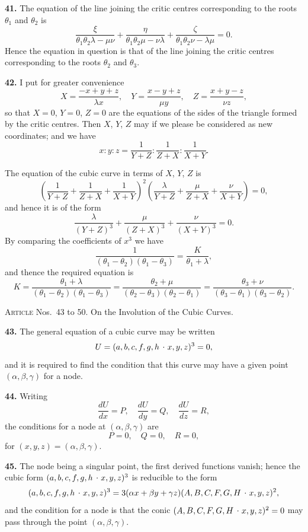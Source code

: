 \documentclass[11pt,a4paper]{article}
\theoremstyle{plain}
\theoremstyle{definition}
\newcommand{\lc}{\kern.17em\raise.5ex\hbox{.}\kern.08em}  %
\begin{document}
\textbf{41.} The equation of the line joining the critic centres corresponding to the roots $\theta_1$ and $\theta_2$ is
\[
\frac{\xi}{\theta_1\theta_2\lambda - \mu\nu} + \frac{\eta}{\theta_1\theta_2\mu - \nu\lambda} + \frac{\zeta}{\theta_1\theta_2\nu - \lambda\mu} = 0.
\]
Hence the equation in question is that of the line joining the critic centres corresponding to the roots $\theta_2$ and $\theta_3$.

\textbf{42.} I put for greater convenience
\[
X = \frac{-x + y + z}{\lambda x},\quad
Y = \frac{x - y + z}{\mu y},\quad
Z = \frac{x + y - z}{\nu z},
\]
so that $X = 0$, $Y = 0$, $Z = 0$ are the equations of the sides of the triangle formed by the critic centres. Then $X$, $Y$, $Z$ may if we please be considered as new coordinates; and we have
\[
x : y : z = \frac{1}{Y + Z} : \frac{1}{Z + X} : \frac{1}{X + Y}.
\]

The equation of the cubic curve in terms of $X$, $Y$, $Z$ is
\[
\left(\frac{1}{Y+Z} + \frac{1}{Z+X} + \frac{1}{X+Y}\right)^2
\left(\frac{\lambda}{Y+Z} + \frac{\mu}{Z+X} + \frac{\nu}{X+Y}\right) = 0,
\]
and hence it is of the form
\[
\frac{\lambda}{(Y+Z)^3} + \frac{\mu}{(Z+X)^3} + \frac{\nu}{(X+Y)^3} = 0.
\]
By comparing the coefficients of $x^3$ we have
\[
\frac{1}{(\theta_1 - \theta_2)(\theta_1 - \theta_3)} = \frac{K}{\theta_1 + \lambda},
\]
and thence the required equation is
\[
K = \frac{\theta_1 + \lambda}{(\theta_1 - \theta_2)(\theta_1 - \theta_3)}
= \frac{\theta_2 + \mu}{(\theta_2 - \theta_3)(\theta_2 - \theta_1)}
= \frac{\theta_3 + \nu}{(\theta_3 - \theta_1)(\theta_3 - \theta_2)}.
\]

\bigskip

\noindent\textsc{Article} Nos.~43 to 50.  On the Involution of the Cubic Curves.

\medskip

\textbf{43.} The general equation of a cubic curve may be written
\[
U = (a, b, c, f, g, h \mathbin{\lc} x, y, z)^3 = 0,
\]
and it is required to find the condition that this curve may have a given point $(\alpha, \beta, \gamma)$ for a node.

\textbf{44.} Writing
\[
\frac{dU}{dx} = P,\quad \frac{dU}{dy} = Q,\quad \frac{dU}{dz} = R,
\]
the conditions for a node at $(\alpha, \beta, \gamma)$ are
\[
P = 0,\quad Q = 0,\quad R = 0,
\]
for $(x, y, z) = (\alpha, \beta, \gamma)$.

\textbf{45.} The node being a singular point, the first derived functions vanish; hence the cubic form $(a, b, c, f, g, h \mathbin{\lc} x, y, z)^3$ is reducible to the form
\[
(a, b, c, f, g, h \mathbin{\lc} x, y, z)^3 = 3(\alpha x + \beta y + \gamma z)(A, B, C, F, G, H \mathbin{\lc} x, y, z)^2,
\]
and the condition for a node is that the conic $(A, B, C, F, G, H \mathbin{\lc} x, y, z)^2 = 0$ may pass through the point $(\alpha, \beta, \gamma)$.
\end{document}
